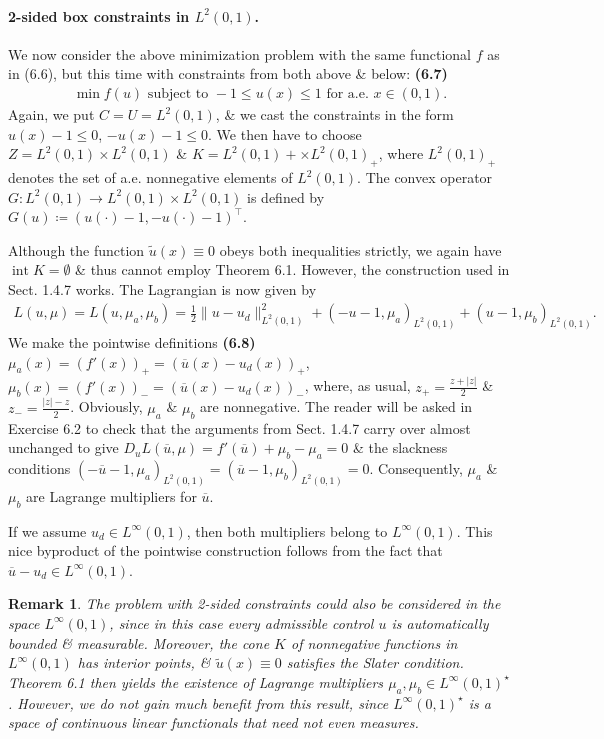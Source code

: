\documentclass[oneside]{book}
\numberwithin{equation}{section}
\newtheorem{remark}{Remark}[chapter]
\begin{document}
\paragraph{2-sided box constraints in $L^2(0,1)$.} We now consider the above minimization problem with the same functional $f$ as in (6.6), but this time with constraints from both above \& below: \textbf{(6.7)}
\begin{align*}
	\min f(u)\mbox{ subject to } -1\le u(x)\le 1\mbox{ for a.e. } x\in(0,1).
\end{align*}
Again, we put $C = U = L^2(0,1)$, \& we cast the constraints in the form $u(x) - 1\le 0$, $-u(x) - 1\le 0$. We then have to choose $Z = L^2(0,1)\times L^2(0,1)$ \& $K = L^2(0,1)+\times L^2(0,1)_+$, where $L^2(0,1)_+$ denotes the set of a.e. nonnegative elements of $L^2(0,1)$. The convex operator $G:L^2(0,1)\to L^2(0,1)\times L^2(0,1)$ is defined by $G(u)\coloneqq(u(\cdot) - 1,-u(\cdot) - 1)^\top$.

Although the function $\widetilde{u}(x)\equiv 0$ obeys both inequalities strictly, we again have $\operatorname{int}K = \emptyset$ \& thus cannot employ Theorem 6.1. However, the construction used in Sect. 1.4.7 works. The Lagrangian is now given by
\begin{align*}
	L(u,\mu) = L(u,\mu_a,\mu_b) = \frac{1}{2}\|u - u_d\|_{L^2(0,1)}^2 + (-u - 1,\mu_a)_{L^2(0,1)} + (u - 1,\mu_b)_{L^2(0,1)}.
\end{align*}
We make the pointwise definitions \textbf{(6.8)} $\mu_a(x) = (f'(x))_+ = (\overline{u}(x) - u_d(x))_+$, $\mu_b(x) = (f'(x))_- = (\overline{u}(x) - u_d(x))_-$, where, as usual, $z_+ = \frac{z + |z|}{2}$ \& $z_- = \frac{|z| - z}{2}$. Obviously, $\mu_a$ \& $\mu_b$ are nonnegative. The reader will be asked in Exercise 6.2 to check that the arguments from Sect. 1.4.7 carry over almost unchanged to give $D_uL(\overline{u},\mu) = f'(\overline{u}) + \mu_b - \mu_a = 0$ \& the slackness conditions $(-\overline{u} - 1,\mu_a)_{L^2(0,1)} = (\overline{u} - 1,\mu_b)_{L^2(0,1)} = 0$. Consequently, $\mu_a$ \& $\mu_b$ are Lagrange multipliers for $\overline{u}$.

If we assume $u_d\in L^\infty(0,1)$, then both multipliers belong to $L^\infty(0,1)$. This nice byproduct of the pointwise construction follows from the fact that $\overline{u} - u_d\in L^\infty(0,1)$.

\begin{remark}
	The problem with 2-sided constraints could also be considered in the space $L^\infty(0,1)$, since in this case every admissible control $u$ is automatically bounded \& measurable. Moreover, the cone $K$ of nonnegative functions in $L^\infty(0,1)$ has interior points, \& $\widetilde{u}(x)\equiv 0$ satisfies the Slater condition. Theorem 6.1 then yields the existence of Lagrange multipliers $\mu_a,\mu_b\in L^\infty(0,1)^\star$. However, we do not gain much benefit from this result, since $L^\infty(0,1)^\star$ is a space of continuous linear functionals that need not even measures.
\end{remark}
\end{document}
